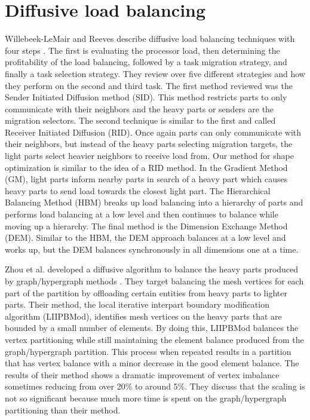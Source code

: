 \documentclass{thesis}
\begin{document}
\section{Diffusive load balancing}
Willebeek-LeMair and Reeves describe diffusive load balancing techniques with 
four steps \cite{loadbalance}. The first is evaluating the processor load, then 
determining the profitability of the load balancing, followed by a task 
migration strategy, and finally a task selection strategy. They review over 
five different strategies and how they perform on the second and third task. 
The first method reviewed was the Sender Initiated Diffusion method (SID). 
This method restricts parts to only communicate with their neighbors and the 
heavy parts or senders are the migration selectors. The second technique is 
similar to the first and called Receiver Initiated Diffusion (RID). Once again 
parts can only communicate with their neighbors, but instead of the heavy parts
selecting migration targets, the light parts select heavier neighbors to receive
load from. Our method for shape optimization is similar to the idea of a RID 
method. In the Gradient Method (GM), light parts inform nearby parts in search 
of a heavy part which causes heavy parts to send load towards the closest light 
part. The Hierarchical Balancing Method (HBM) breaks up load balancing into a 
hierarchy of parts and performs load balancing at a low level and then continues
to balance while moving up a hierarchy. The final method is the Dimension 
Exchange Method (DEM). Similar to the HBM, the DEM approach balances at a low 
level and works up, but the DEM balances synchronously in all dimensions one at 
a time.

Zhou et al. developed a diffusive algorithm to balance the heavy parts produced 
by graph/hypergraph methods \cite{zhougraph}. They target balancing the mesh vertices for each
part of the partition by offloading certain entities from heavy parts to 
lighter parts. Their method, the local iterative interpart boundary 
modification algorithm (LIIPBMod), identifies mesh vertices on the heavy parts
that are bounded by a small number of elements. By doing this, LIIPBMod 
balances the vertex partitioning while still maintaining the element balance
produced from the graph/hypergraph partition. This process when repeated 
results in a partition that has vertex balance with a minor decrease in the 
good element balance. The results of their method shows a dramatic improvement
of vertex imbalance sometimes reducing from over 20\% to around 5\%. They 
discuss that the scaling is not so significant because much more time is spent 
on the graph/hypergraph partitioning than their method.
\end{document}

